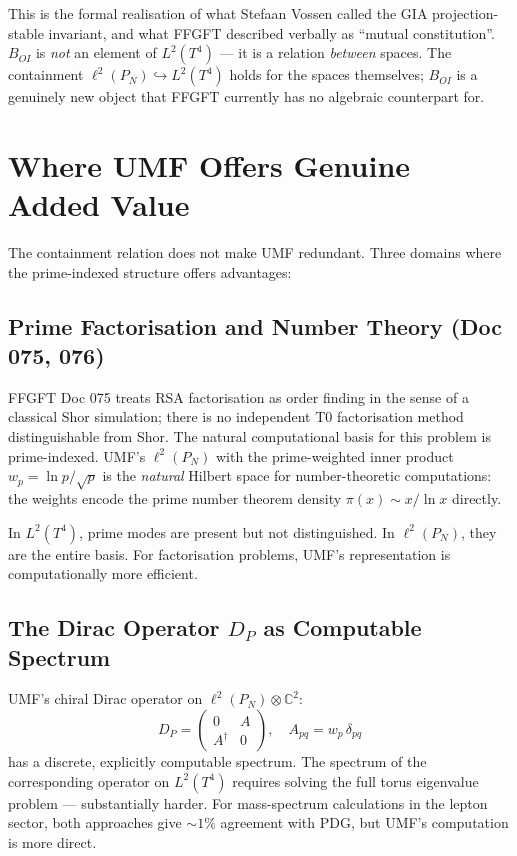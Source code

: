 This is the formal realisation of what Stefaan Vossen called the GIA
projection-stable invariant, and what FFGFT described verbally as
``mutual constitution''. $B_{OI}$ is \emph{not} an element of $L^2(T^4)$
— it is a relation \emph{between} spaces. The containment
$\ell^2(P_N) \hookrightarrow L^2(T^4)$ holds for the spaces themselves;
$B_{OI}$ is a genuinely new object that FFGFT currently has no algebraic
counterpart for.

\section{Where UMF Offers Genuine Added Value}

The containment relation does not make UMF redundant. Three domains where
the prime-indexed structure offers advantages:

\subsection{Prime Factorisation and Number Theory (Doc 075, 076)}

FFGFT Doc 075 treats RSA factorisation as order finding in the sense of a
classical Shor simulation; there is no independent T0 factorisation method
distinguishable from Shor. The natural computational
basis for this problem is prime-indexed. UMF's $\ell^2(P_N)$ with the
prime-weighted inner product $w_p = \ln p/\sqrt{p}$ is the \emph{natural}
Hilbert space for number-theoretic computations: the weights encode the
prime number theorem density $\pi(x) \sim x/\ln x$ directly.

In $L^2(T^4)$, prime modes are present but not distinguished. In $\ell^2(P_N)$,
they are the entire basis. For factorisation problems, UMF's representation
is computationally more efficient.

\subsection{The Dirac Operator \texorpdfstring{$D_P$}{D\_P} as Computable Spectrum}

UMF's chiral Dirac operator on $\ell^2(P_N) \otimes \mathbb{C}^2$:
\begin{equation}
  D_P = \begin{pmatrix} 0 & A \\ A^\dagger & 0 \end{pmatrix},
  \quad A_{pq} = w_p\,\delta_{pq}
  \tag{244.5}
\end{equation}
has a discrete, explicitly computable spectrum. The spectrum of the
corresponding operator on $L^2(T^4)$ requires solving the full torus
eigenvalue problem — substantially harder. For mass-spectrum calculations
in the lepton sector, both approaches give $\sim 1\%$ agreement with PDG,
but UMF's computation is more direct.

